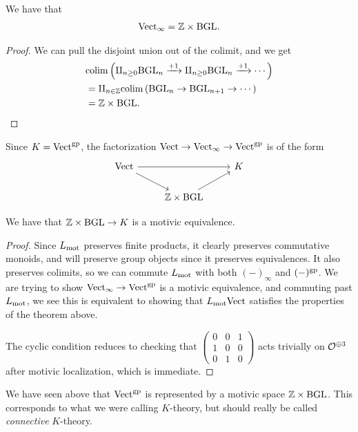 \documentclass[11pt,openany]{book}
\begin{document}
\begin{proposition} We have that
\begin{align*}
    \mathrm{Vect}_\infty = \mathbb{Z} \times \mathrm{BGL}.
\end{align*}
\end{proposition}
\begin{proof} We can pull the disjoint union out of the colimit, and we get
\begin{align*}
    &\mathrm{colim} \left( \amalg_{n\ge0} \mathrm{BGL}_n\xrightarrow{\text{+1}} \amalg_{n\ge0} \mathrm{BGL}_n\xrightarrow{\text{+1}}\cdots \right) \\
    &= \amalg_{n\in \mathbb{Z}} \mathrm{colim} \left( \mathrm{BGL}_n \to \mathrm{BGL}_{n+1} \to \cdots \right) \\
    &= \mathbb{Z} \times \mathrm{BGL}.
\end{align*}
\end{proof}

Since $K = \mathrm{Vect}^{\mathrm{gp}}$, the factorization $\mathrm{Vect} \to \mathrm{Vect}_\infty \to \mathrm{Vect}^{\mathrm{gp}}$ is of the form
\[ \begin{tikzcd}
    \Vect\ar[rr]\ar[dr] &  & K\\
     & \Z \times \BGL\ar[ur] &
\end{tikzcd} \]

\begin{theorem} We have that $\mathbb{Z} \times \mathrm{BGL} \to K$ is a motivic equivalence.
\end{theorem}
\begin{proof} Since $L_{\mathrm{mot}}$ preserves finite products, it clearly preserves commutative monoids, and will preserve group objects since it preserves equivalences. It also preserves colimits, so we can commute $L_{\mathrm{mot}}$ with both $(-)_\infty$ and $(-)^{\mathrm{gp}}$. We are trying to show $\mathrm{Vect}_\infty \to \mathrm{Vect}^{\mathrm{gp}}$ is a motivic equivalence, and commuting past $L_{\mathrm{mot}}$, we see this is equivalent to showing that $L_{\mathrm{mot}} \mathrm{Vect}$ satisfies the properties of the theorem above.

The cyclic condition reduces to checking that $\begin{pmatrix} 0 & 0 & 1 \\ 1 & 0 & 0 \\ 0 & 1 & 0 \end{pmatrix}$ acts trivially on $\mathcal{O}^{\oplus3}$ after motivic localization, which is immediate.
\end{proof}


We have seen above that $\mathrm{Vect}^{\mathrm{gp}}$ is represented by a motivic space $\mathbb{Z} \times \mathrm{BGL}$. This corresponds to what we were calling $K$-theory, but should really be called \textit{connective} $K$-theory.
\end{document}
